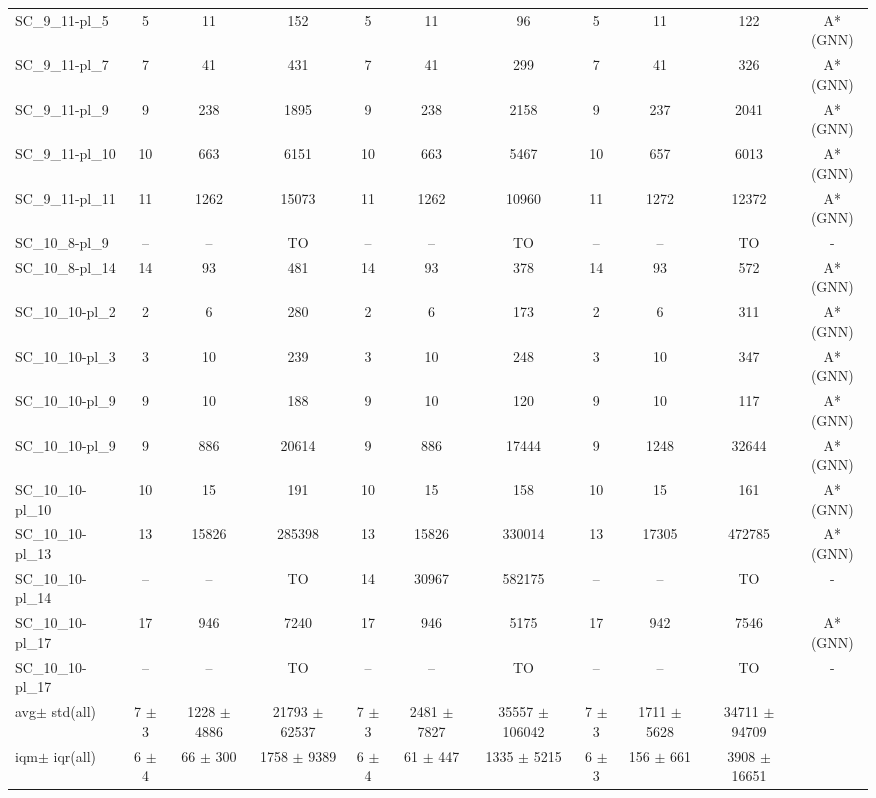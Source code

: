 \documentclass{article}
\newcommand{\unsolvedColumn}{--}
\newcommand{\myTO}{TO}
\newcommand{\myAvg}{avg}
\newcommand{\myStd}{std}
\newcommand{\IQM}{iqm}
\newcommand{\IQR}{iqr}
\newcommand{\allInstances}{all}
\begin{document}
\begin{longtable}[!ht]{l|ccc|ccc|cccc}
SC\_9\_11-pl\_5 & 5 & 11 & 152 & 5 & 11 & 96 & 5 & 11 & 122 & A*(GNN) \\
SC\_9\_11-pl\_7 & 7 & 41 & 431 & 7 & 41 & 299 & 7 & 41 & 326 & A*(GNN) \\
SC\_9\_11-pl\_9 & 9 & 238 & 1895 & 9 & 238 & 2158 & 9 & 237 & 2041 & A*(GNN) \\
SC\_9\_11-pl\_10 & 10 & 663 & 6151 & 10 & 663 & 5467 & 10 & 657 & 6013 & A*(GNN) \\
SC\_9\_11-pl\_11 & 11 & 1262 & 15073 & 11 & 1262 & 10960 & 11 & 1272 & 12372 & A*(GNN) \\
SC\_10\_8-pl\_9 & \unsolvedColumn & \unsolvedColumn & \myTO & \unsolvedColumn & \unsolvedColumn & \myTO & \unsolvedColumn & \unsolvedColumn & \myTO & - \\
SC\_10\_8-pl\_14 & 14 & 93 & 481 & 14 & 93 & 378 & 14 & 93 & 572 & A*(GNN) \\
SC\_10\_10-pl\_2 & 2 & 6 & 280 & 2 & 6 & 173 & 2 & 6 & 311 & A*(GNN) \\
SC\_10\_10-pl\_3 & 3 & 10 & 239 & 3 & 10 & 248 & 3 & 10 & 347 & A*(GNN) \\
SC\_10\_10-pl\_9 & 9 & 10 & 188 & 9 & 10 & 120 & 9 & 10 & 117 & A*(GNN) \\
SC\_10\_10-pl\_9 & 9 & 886 & 20614 & 9 & 886 & 17444 & 9 & 1248 & 32644 & A*(GNN) \\
SC\_10\_10-pl\_10 & 10 & 15 & 191 & 10 & 15 & 158 & 10 & 15 & 161 & A*(GNN) \\
SC\_10\_10-pl\_13 & 13 & 15826 & 285398 & 13 & 15826 & 330014 & 13 & 17305 & 472785 & A*(GNN) \\
SC\_10\_10-pl\_14 & \unsolvedColumn & \unsolvedColumn & \myTO & 14 & 30967 & 582175 & \unsolvedColumn & \unsolvedColumn & \myTO & - \\
SC\_10\_10-pl\_17 & 17 & 946 & 7240 & 17 & 946 & 5175 & 17 & 942 & 7546 & A*(GNN) \\
SC\_10\_10-pl\_17 & \unsolvedColumn & \unsolvedColumn & \myTO & \unsolvedColumn & \unsolvedColumn & \myTO & \unsolvedColumn & \unsolvedColumn & \myTO & - \\
\hline
\myAvg  $\pm$ \myStd \hfill (\allInstances) & 7 $\pm$ 3 & 1228 $\pm$ 4886 & 21793 $\pm$ 62537 & 7 $\pm$ 3 & 2481 $\pm$ 7827 & 35557 $\pm$ 106042 & 7 $\pm$ 3 & 1711 $\pm$ 5628 & 34711 $\pm$ 94709 &  \\
\IQM $\pm$ \IQR \hfill (\allInstances) & 6 $\pm$ 4 & 66 $\pm$ 300 & 1758 $\pm$ 9389 & 6 $\pm$ 4 & 61 $\pm$ 447 & 1335 $\pm$ 5215 & 6 $\pm$ 3 & 156 $\pm$ 661 & 3908 $\pm$ 16651 &  \\

\end{longtable}
\end{document}
